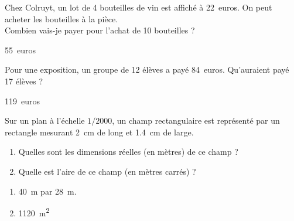 \documentclass[../../syllabus_2.tex]{subfiles}
\begin{document}
\begin{exercise}
    Chez Colruyt, un lot de 4 bouteilles de vin est affiché à \SI{22}{euros}. On peut acheter les bouteilles à la pièce. \\
    Combien vais-je payer pour l'achat de 10 bouteilles ?
\end{exercise}
\begin{solution}
    \SI{55}{euros}
\end{solution}

\begin{exercise}
    Pour une exposition, un groupe de 12 élèves a payé \SI{84}{euros}. Qu'auraient payé 17 élèves ?
\end{exercise}
\begin{solution}
    \SI{119}{euros}
\end{solution}

\begin{exercise}
    Sur un plan à l'échelle \(1/\num{2000}\), un champ rectangulaire est représenté par un rectangle mesurant \SI{2}{cm} de long et \SI{1,4}{cm} de large.
    \begin{enumerate}
        \item Quelles sont les dimensions réelles (en mètres)  de ce champ ?
        \item Quelle est l'aire de ce champ (en mètres carrés) ?
    \end{enumerate}
\end{exercise}
\begin{solution}
    \begin{enumerate}
        \item \SI{40}{m} par \SI{28}{m}.
        \item \SI{1120}{m^2}
    \end{enumerate}
\end{solution}
\end{document}
